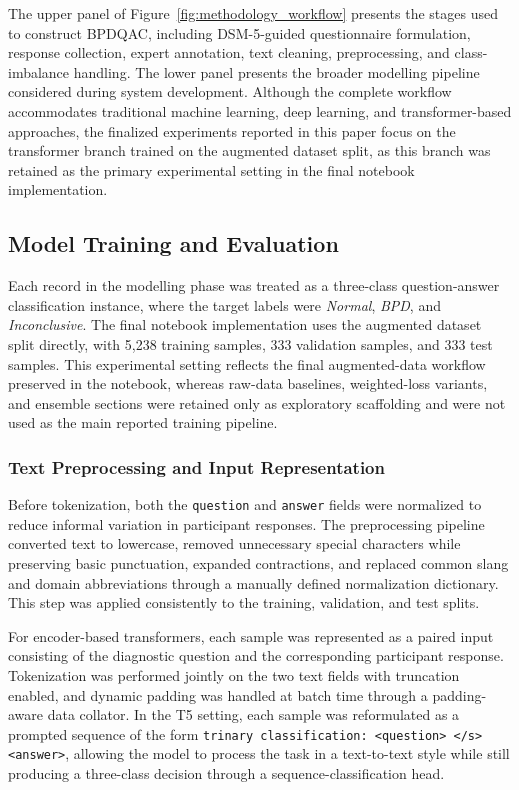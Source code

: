 \documentclass{article}
\begin{document}
The upper panel of Figure~\ref{fig:methodology_workflow} presents the stages used to construct BPDQAC, including DSM-5-guided questionnaire formulation, response collection, expert annotation, text cleaning, preprocessing, and class-imbalance handling. The lower panel presents the broader modelling pipeline considered during system development. Although the complete workflow accommodates traditional machine learning, deep learning, and transformer-based approaches, the finalized experiments reported in this paper focus on the transformer branch trained on the augmented dataset split, as this branch was retained as the primary experimental setting in the final notebook implementation.

\subsection{Model Training and Evaluation}
Each record in the modelling phase was treated as a three-class question-answer classification instance, where the target labels were \textit{Normal}, \textit{BPD}, and \textit{Inconclusive}. The final notebook implementation uses the augmented dataset split directly, with 5,238 training samples, 333 validation samples, and 333 test samples. This experimental setting reflects the final augmented-data workflow preserved in the notebook, whereas raw-data baselines, weighted-loss variants, and ensemble sections were retained only as exploratory scaffolding and were not used as the main reported training pipeline.

\subsubsection{Text Preprocessing and Input Representation}
Before tokenization, both the \texttt{question} and \texttt{answer} fields were normalized to reduce informal variation in participant responses. The preprocessing pipeline converted text to lowercase, removed unnecessary special characters while preserving basic punctuation, expanded contractions, and replaced common slang and domain abbreviations through a manually defined normalization dictionary. This step was applied consistently to the training, validation, and test splits.

For encoder-based transformers, each sample was represented as a paired input consisting of the diagnostic question and the corresponding participant response. Tokenization was performed jointly on the two text fields with truncation enabled, and dynamic padding was handled at batch time through a padding-aware data collator. In the T5 setting, each sample was reformulated as a prompted sequence of the form \texttt{trinary classification: <question> </s> <answer>}, allowing the model to process the task in a text-to-text style while still producing a three-class decision through a sequence-classification head.
\end{document}
